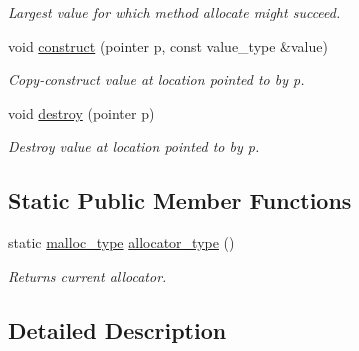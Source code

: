 \begin{DoxyCompactItemize}
\begin{DoxyCompactList}\small\item\em Largest value for which method allocate might succeed. \end{DoxyCompactList}\item 
\hypertarget{classtbb_1_1tbb__allocator_a694e266db657afba34ecb60111b2e2d3}{}void \hyperlink{classtbb_1_1tbb__allocator_a694e266db657afba34ecb60111b2e2d3}{construct} (pointer p, const value\+\_\+type \&value)\label{classtbb_1_1tbb__allocator_a694e266db657afba34ecb60111b2e2d3}

\begin{DoxyCompactList}\small\item\em Copy-\/construct value at location pointed to by p. \end{DoxyCompactList}\item 
\hypertarget{classtbb_1_1tbb__allocator_ac7b1b393a8ff3399079328c0971c1996}{}void \hyperlink{classtbb_1_1tbb__allocator_ac7b1b393a8ff3399079328c0971c1996}{destroy} (pointer p)\label{classtbb_1_1tbb__allocator_ac7b1b393a8ff3399079328c0971c1996}

\begin{DoxyCompactList}\small\item\em Destroy value at location pointed to by p. \end{DoxyCompactList}\end{DoxyCompactItemize}
\subsection*{Static Public Member Functions}
\begin{DoxyCompactItemize}
\item 
\hypertarget{classtbb_1_1tbb__allocator_aa4606cff0156ec4237c1571204851bfb}{}static \hyperlink{classtbb_1_1tbb__allocator_a60463a571d5c20f7762112367261ad94}{malloc\+\_\+type} \hyperlink{classtbb_1_1tbb__allocator_aa4606cff0156ec4237c1571204851bfb}{allocator\+\_\+type} ()\label{classtbb_1_1tbb__allocator_aa4606cff0156ec4237c1571204851bfb}

\begin{DoxyCompactList}\small\item\em Returns current allocator. \end{DoxyCompactList}\end{DoxyCompactItemize}


\subsection{Detailed Description}
